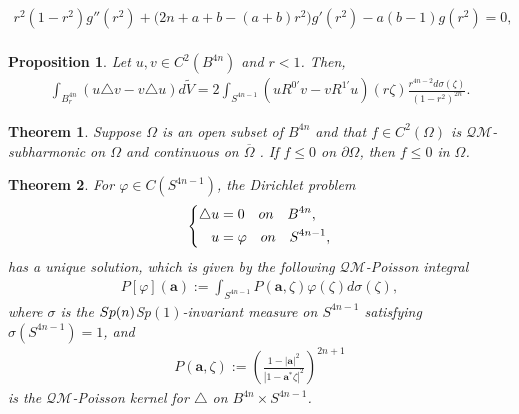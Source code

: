 \documentclass[10pt,a4paper]{amsart}
\newtheorem{thm}{Theorem}
\newtheorem{prop}{Proposition}
\begin{document}
\begin{equation}\begin{aligned}\label{g eq}
r^2(1-r^2)g''(r^2)+ \bigl(2n+a+b-(a+b)r^2\bigr)g'(r^2)- a(b-1)g(r^2)=0,\\
\end{aligned}\end{equation}

\begin{prop}\label{Green}
Let $u,v\in C^2(B^{4n})$ and $r<1$. Then,
\begin{equation}\begin{aligned}\label{eq green}
\int_{B_{r}^{4n}}(u\triangle v-v\triangle u) d\widetilde{V}=2\int_{S^{4n-1}}(uR^{0'}v-vR^{1'}u)(r\zeta)\frac{r^{4n-2}d\sigma(\zeta)}{(1-r^2)^{2n}}.
\end{aligned}\end{equation}

\end{prop}

\begin{thm}\label{max}
Suppose $\Omega$ is an open subset of $B^{4n}$ and
that $f \in C^2(\Omega)$ is $\mathcal{QM}$-subharmonic on $\Omega$ and continuous on $\overline{\Omega}$ . If $f \leq 0$ on $\partial \Omega$,
then $f \leq 0$ in $\Omega$.
\end{thm}

\begin{thm}\label{posson}
For $\varphi\in C(S^{4n-1})$, the Dirichlet problem
\begin{equation}\begin{aligned}\label{Dirichlet p}
\left\{
\begin{aligned}
 \triangle u&=0 {\rm\quad on}\quad B^{4n},\\
u&=\varphi {\rm \quad on}\quad S^{4n-1},
\end{aligned}
\right.
\end{aligned}\end{equation}
has a unique solution, which is given by the following $\mathcal{QM}$-Poisson integral
\begin{equation}\begin{aligned}\label{def poisson int}
P[\varphi](\mathbf{a}):=\int_{S^{4n-1}} P(\mathbf{a},\zeta)\varphi(\zeta)d\sigma(\zeta),
\end{aligned}\end{equation}
 where $\sigma$ is the ${\rm Sp}(n)$Sp$(1)$-invariant measure on $S^{4n-1}$ satisfying $\sigma(S^{4n-1})=1$, and
\begin{equation}\begin{aligned}\label{def poisson k}
P(\mathbf{a},\zeta):=\left(\frac{1-|\mathbf{a}|^2}{|1-\mathbf{a}^*\zeta|^2}\right)^{2n+1}
\end{aligned}\end{equation}
is the $\mathcal{QM}$-Poisson kernel for $\triangle$ on $B^{4n}\times S^{4n-1}$.
\end{thm}
\end{document}
